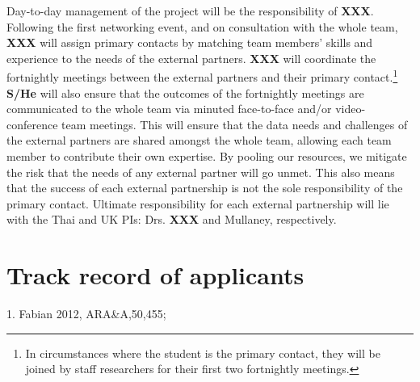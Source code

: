 \documentclass[11pt]{article}
\begin{document}
\vspace{2mm}
\noindent
Day-to-day management of the project will be the responsibility of {\bf XXX}.
Following the first networking event, and on consultation with the whole team, {\bf XXX} will assign primary contacts by matching team members' skills and experience to the needs of the external partners. {\bf XXX} will coordinate the fortnightly meetings between the external partners and their primary contact.\footnote{In circumstances where the student is the primary contact, they will be joined by staff researchers for their first two fortnightly meetings.} {\bf S/He} will also ensure that the outcomes of the fortnightly meetings are communicated to the whole team via minuted face-to-face and/or video-conference team meetings. This will ensure that the data needs and challenges of the external partners are shared amongst the whole team, allowing each team member to contribute their own expertise. By pooling our resources, we mitigate the risk that the needs of any external partner will go unmet. This also means that the success of each external partnership is not the sole responsibility of the primary contact. Ultimate responsibility for each external partnership will lie with the Thai and UK PIs: Drs. {\bf XXX} and Mullaney, respectively. 

\section{Track record of applicants}


\vspace{10mm}
 {\scriptsize 1. Fabian 2012,
  ARA\&A,50,455;
}
\end{document}
